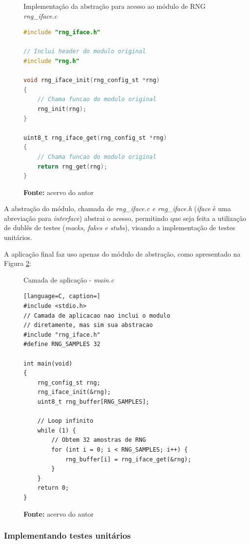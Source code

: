 \documentclass[times, twoside, watermark]{artigo}
\begin{document}
\begin{figure}[H]
  \centering
  \caption{Implementação da abstração para acesso ao módulo de RNG
\textit{rng\_iface.c}}
\begin{lstlisting}[language=C]
#include "rng_iface.h"

// Inclui header do modulo original
#include "rng.h"

void rng_iface_init(rng_config_st *rng)
{
    // Chama funcao do modulo original
    rng_init(rng);
}

uint8_t rng_iface_get(rng_config_st *rng)
{
    // Chama funcao do modulo original
    return rng_get(rng);
}

\end{lstlisting}
  \label{fig:rng_iface.c}
  \caption*{\newline\textbf{Fonte:} acervo do autor}
\end{figure}

A abstração do módulo, chamada de \textit{rng\_iface.c e rng\_iface.h}
(\textit{iface} é uma abreviação para \textit{interface}) abstrai o
acesso, permitindo que seja feita a utilização de dublês de testes (\textit{mocks,
  fakes e stubs}), visando a implementação de testes unitários.

A aplicação final faz uso apenas do módulo de abstração, como apresentado na Figura 
\ref{fig:main.c}:\hfill\\

\begin{figure}[H]
  \centering
  \caption{Camada de aplicação - \textit{main.c}}
\begin{lstlisting}[language=C, caption=]
#include <stdio.h>
// Camada de aplicacao nao inclui o modulo
// diretamente, mas sim sua abstracao
#include "rng_iface.h"
#define RNG_SAMPLES 32

int main(void)
{	
	rng_config_st rng;
	rng_iface_init(&rng);
	uint8_t rng_buffer[RNG_SAMPLES];
    
	// Loop infinito
	while (1) {
		// Obtem 32 amostras de RNG
		for (int i = 0; i < RNG_SAMPLES; i++) {
			rng_buffer[i] = rng_iface_get(&rng);
		}
	}
    return 0;
}
\end{lstlisting}
  \label{fig:main.c}
  \caption*{\newline\textbf{Fonte:} acervo do autor}
\end{figure}

\subsubsection{Implementando testes unitários}\hfill\\
\end{document}
